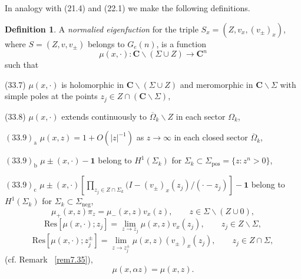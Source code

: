 \documentclass{surv-l}
\theoremstyle{plain}
\theoremstyle{definition}
\newtheorem{definition}[theorem]{Definition}
\numberwithin{equation}{chapter}
\begin{document}
In analogy with (21.4) and (22.1) we make the following definitions.
\setcounter{theorem}{5}
\begin{definition}\label{defi33.6}
A \emph{normalied eigenfuction} for the triple $S_{x}=(Z, v_{x}, (v_{\pm} )_{x})$, where $S= (Z, v, v_{\pm})$ belongs to $G_{e}(n)$, is a function
\begin{equation*}
\mu(x, \cdot):\mathbf{C}\backslash (\Sigma\cup Z)\rightarrow \mathbf{C}^{n}
\end{equation*}
such that

(33.7) $\mu(x, \cdot)$ is holomorphic in $\mathbf{C}\backslash (\Sigma\cup Z)$ and meromorphic in $ \mathbf{C}\backslash \Sigma$ with simple poles at the points $z_{j}\in Z\cap(\mathbf{C}\backslash \Sigma)$,

(33.8) $\mu(x, \cdot)$ extends continuously to $\overline{\Omega}_{k}\backslash Z$ in each sector $\Omega_{k}$,

$(33.9)_{\mathrm{a}}$ $\mu(x,z)=\mathrm{1}+O(|z|^{-1})$ as $ z\rightarrow\infty$ in each closed sector $\overline{\Omega}_{k}$,

$(33.9)_{\mathrm{b}}$ $\mu\pm(x, \cdot)-\mathbf{1}$ belong to $H^{1}(\Sigma_{k})$ for $\Sigma_{k}\subset\Sigma_{\mathrm{pos}}=\{z:z^{n}>0\}$,

$(33.9)_{\mathrm{c}}$ $\mu\pm(x, \cdot)[\prod_{z_{j}\in Z\cap\Sigma_{k}}(I-(v_{\pm})_{x}(z_{j})/(\cdot-z_{j})]-\mathbf{1}$ belong to $H^{1}(\Sigma_{k})$ for $\Sigma_{k}\subset\Sigma_{\mathrm{neg}}$,
\setcounter{equation}{9}
\begin{equation}\label{eq33.10}
\mu_{+}(x, z)\pi_{z}=\mu_{-}(x, z)v_{x}(z),\qquad z\in\Sigma\backslash (Z\cup 0),
\end{equation}
\begin{equation}\label{eq33.11}
\mathrm{Res}[\mu(x, \cdot);z_{j}]=\lim_{z\rightarrow z_{j}}\mu(x,z)v_{x}(z_{j}),\qquad z_{j}\in Z\backslash \Sigma,
\end{equation}
\begin{equation*}
\mathrm{Res}[\mu(x, \cdot); z_{j}^{\pm}]=\lim_{z\rightarrow z_{j}^{\pm}}\mu(x, z)(v_{\pm})_{x}(z_{j}),\qquad z_{j}\in Z\cap\Sigma,
\end{equation*}
(cf. Remark ~\ref{rem7.35}),
\begin{equation}\label{eq33.12}
\mu(x, \alpha z)=\mu(x,z).
\end{equation}
\end{definition}
\end{document}
